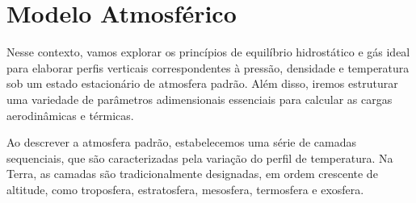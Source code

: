 












































































\section{Modelo Atmosférico}

Nesse contexto, vamos explorar os princípios de equilíbrio hidrostático e gás ideal para elaborar perfis verticais correspondentes à pressão, densidade e temperatura sob um estado estacionário de atmosfera padrão. Além disso, iremos estruturar uma variedade de parâmetros adimensionais essenciais para calcular as cargas aerodinâmicas e térmicas.

Ao descrever a atmosfera padrão, estabelecemos uma série de camadas sequenciais, que são caracterizadas pela variação do perfil de temperatura. Na Terra, as camadas são tradicionalmente designadas, em ordem crescente de altitude, como troposfera, estratosfera, mesosfera, termosfera e exosfera.

